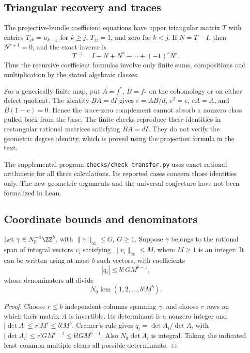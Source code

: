 \subsection{Triangular recovery and traces}

The projective-bundle coefficient equations have upper triangular
matrix \(T\) with entries \(T_{jk}=u_{k-j}\) for \(k\ge j\),
\(T_{jj}=1\), and zero for \(k<j\). If \(N=T-I\), then
\(N^{r+1}=0\), and the exact inverse is
\[
 T^{-1}=I-N+N^2-\cdots+(-1)^rN^r.
\]
Thus the recursive coefficient formulas involve only finite sums,
compositions and multiplication by the stated algebraic classes.

For a generically finite map, put \(A=f^*\), \(B=f_*\) on
the cohomology or on either defect quotient. The identity \(BA=dI\)
gives \(e=AB/d\), \(e^2=e\), \(eA=A\), and
\(B(1-e)=0\). Hence the trace-zero complement cannot absorb a
nonzero class pulled back from the base. The finite checks reproduce
these identities in rectangular rational matrices satisfying
\(BA=dI\). They do not verify the geometric degree identity, which
is proved using the projection formula in the text.

The supplemental program \texttt{checks/check\_transfer.py} uses
exact rational arithmetic for all three calculations. Its reported
cases concern those identities only. The new geometric arguments
and the universal conjecture have not been formalized in Lean.

\subsection{Coordinate bounds and denominators}

\begin{lemma}
\label{v7:new:lem:cramer}
Let \(\gamma\in N_0^{-1}\ZZ^b\), with
\(\|\gamma\|_\infty\le G\), \(G\ge1\). Suppose \(\gamma\) belongs
to the rational span of integral vectors \(v_i\) satisfying
\(\|v_i\|_\infty\le M\), where \(M\ge1\) is an integer.
It can be written using at most \(b\) such vectors, with coefficients
\[
 |q_i|\le b!\,G M^{b-1},
\]
whose denominators all divide
\[
 N_0\operatorname{lcm}(1,2,\ldots,b!M^b).
\]
\end{lemma}

\begin{proof}
Choose \(r\le b\) independent columns spanning \(\gamma\), and
choose \(r\) rows on which their matrix \(A\) is invertible.
Its determinant is a nonzero integer and
\(|\det A|\le r!M^r\le b!M^b\).
Cramer's rule gives
\(q_i=\det A_i/\det A\), with
\(|\det A_i|\le r!G M^{r-1}\le b!G M^{b-1}\).
Also \(N_0\det A_i\) is integral. Taking the indicated least
common multiple clears all possible determinants.
\end{proof}

